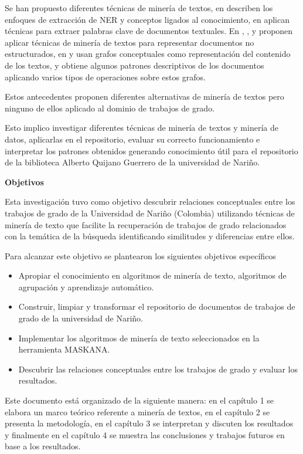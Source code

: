 Se han propuesto diferentes técnicas de minería de textos, en \cite{troyano2003identificacion} 
describen los enfoques de extracción de NER y conceptos ligados al conocimiento, en \cite{figuerola2004algunas}
aplican técnicas para extraer palabras clave de documentos textuales.
En \cite{llorens1998caracteristicas}, \cite{santana2014aplicacion}, \cite{barrera2016mineria} y \cite{rodriguez2018metodos}
proponen aplicar técnicas de minería de textos para representar documentos no estructurados,
en \cite{MONTESYGOMEZ2005} y  \cite{munozutilizacion}
usan grafos conceptuales como representación del contenido de los textos, y obtiene algunos patrones descriptivos de los documentos aplicando varios tipos de operaciones sobre estos grafos.

Estos antecedentes proponen diferentes alternativas de minería de textos pero ninguno de ellos aplicado al dominio de trabajos de grado. 

Esto implico  investigar diferentes técnicas de minería de textos y minería de datos, aplicarlas
en el repositorio, evaluar su correcto funcionamiento e interpretar los patrones obtenidos generando conocimiento
útil para el repositorio de la biblioteca Alberto Quijano Guerrero de la universidad de Nariño.


\textbf{Objetivos}
 
Esta investigación tuvo como objetivo  descubrir relaciones conceptuales entre los trabajos de grado de la Universidad de Nariño (Colombia)
utilizando técnicas de minería de texto que facilite la recuperación de trabajos de grado
relacionados con la temática de la búsqueda identificando  similitudes y diferencias  entre ellos.

Para alcanzar este objetivo se plantearon los siguientes objetivos específicos 

\begin{itemize}
\item Apropiar el conocimiento en algoritmos de minería de texto, algoritmos de agrupación  y aprendizaje automático.
\item Construir, limpiar y transformar  el repositorio de documentos de trabajos de grado de la universidad de Nariño.
\item Implementar los algoritmos de minería de texto seleccionados en la herramienta MASKANA.
\item Descubrir las relaciones conceptuales entre los trabajos de grado y evaluar los resultados.
\end{itemize}


Este documento está organizado de la siguiente manera: en el capítulo 1 se elabora un marco teórico referente a minería de textos, en el capítulo 2 se presenta la metodología, en el capítulo 3 se interpretan y discuten los resultados y finalmente  en el capítulo 4 se muestra las conclusiones y trabajos futuros en base a los resultados.